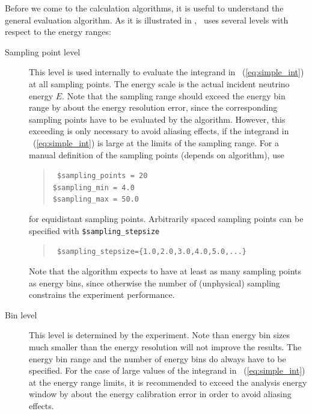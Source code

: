 Before we come to the calculation algorithms, it is useful to understand
the general evaluation algorithm. As it is illustrated in , 
\GLOBES\ uses several levels with respect to the energy ranges:
\begin{description}
\item[Sampling point level]
 This level is used internally to evaluate the integrand in \eq~(\ref{eq:simple_int}) at all sampling points. The energy scale is the actual incident neutrino energy $E$. Note that the sampling range should exceed the energy bin range by about the energy resolution error, since the corresponding sampling points have to be evaluated by the algorithm. 
However, this exceeding is only
necessary to avoid aliasing effects, if the integrand in \eq~(\ref{eq:simple_int}) is large at the limits of the sampling range.
For a manual definition of the sampling points (depends on algorithm), use
\begin{quote}
{\tt
\$sampling\_points = 20\\
\$sampling\_min =          4.0\\
\$sampling\_max =         50.0
}
\end{quote}
for equidistant sampling points. Arbitrarily spaced sampling points can 
be specified with 
{\tt \$sampling\_stepsize}
\begin{quote}
{\tt
\$sampling\_stepsize=\{1.0,2.0,3.0,4.0,5.0,...\}
}
\end{quote}


 
Note that the algorithm expects to 
have at least as many sampling points as energy bins, since otherwise 
the number of (unphysical) sampling constrains the experiment performance.
\item[Bin level] This level is determined by the experiment. Note than energy
bin sizes much smaller than the energy resolution will not improve the results. The energy bin range and the number of energy bins do always have to be specified. For the case of large values of the integrand in \eq~(\ref{eq:simple_int}) at the energy range limits, it is recommended to exceed the analysis energy window by about the energy calibration error in order to avoid aliasing effects.


\end{description}
